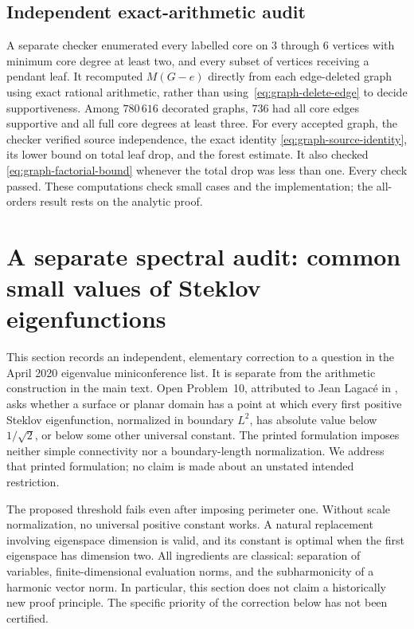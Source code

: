 \documentclass[11pt,a4paper]{article}
\theoremstyle{definition}\newtheorem{definition}[theorem]{Definition}
\theoremstyle{remark}\newtheorem{remark}[theorem]{Remark}
\begin{document}
\subsection{Independent exact-arithmetic audit}

A separate checker enumerated every labelled core on $3$ through $6$
vertices with minimum core degree at least two, and every subset of
vertices receiving a pendant leaf. It recomputed $M(G-e)$ directly
from each edge-deleted graph using exact rational arithmetic, rather
than using~\eqref{eq:graph-delete-edge} to decide supportiveness.
Among $780\,616$ decorated graphs, $736$ had all core edges supportive
and all full core degrees at least three. For every accepted graph,
the checker verified source independence, the exact identity
\eqref{eq:graph-source-identity}, its lower bound on total leaf drop,
and the forest estimate. It also checked
\eqref{eq:graph-factorial-bound} whenever the total drop was less than
one. Every check passed. These computations check small cases and the
implementation; the all-orders result rests on the analytic proof.
\section{A separate spectral audit: common small values of Steklov eigenfunctions}
\label{sec:steklov-audit}

This section records an independent, elementary correction to a question
in the April 2020 eigenvalue miniconference list. It is separate from the
arithmetic construction in the main text. Open Problem~10, attributed to
Jean Lagac\'e in \cite{Lagace2020}, asks whether a surface or planar domain
has a point at which every first positive Steklov eigenfunction, normalized
in boundary $L^2$, has absolute value below $1/\sqrt2$, or below some other
universal constant. The printed formulation imposes neither simple
connectivity nor a boundary-length normalization. We address that printed
formulation; no claim is made about an unstated intended restriction.

The proposed threshold fails even after imposing perimeter one. Without
scale normalization, no universal positive constant works. A natural
replacement involving eigenspace dimension is valid, and its constant is
optimal when the first eigenspace has dimension two. All ingredients are
classical: separation of variables, finite-dimensional evaluation norms,
and the subharmonicity of a harmonic vector norm. In particular, this
section does not claim a historically new proof principle. The specific
priority of the correction below has not been certified.
\end{document}
